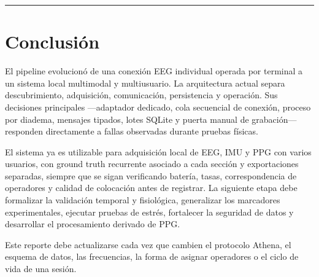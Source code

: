 \documentclass[11pt,a4paper]{article}
\begin{document}
\medskip\hrule\medskip

\section{Conclusión}

El pipeline evolucionó de una conexión EEG individual operada por terminal a un sistema local multimodal y multiusuario. La arquitectura actual separa descubrimiento, adquisición, comunicación, persistencia y operación. Sus decisiones principales —adaptador dedicado, cola secuencial de conexión, proceso por diadema, mensajes tipados, lotes SQLite y puerta manual de grabación— responden directamente a fallas observadas durante pruebas físicas.

El sistema ya es utilizable para adquisición local de EEG, IMU y PPG con varios usuarios,
con ground truth recurrente asociado a cada sección y exportaciones separadas, siempre que se sigan verificando
batería, tasas, correspondencia de operadores y calidad de colocación antes de registrar.
La siguiente etapa debe formalizar la validación temporal y fisiológica, generalizar los
marcadores experimentales, ejecutar pruebas de estrés, fortalecer la seguridad de datos y
desarrollar el procesamiento derivado de PPG.

Este reporte debe actualizarse cada vez que cambien el protocolo Athena, el esquema de datos, las frecuencias, la forma de asignar operadores o el ciclo de vida de una sesión.
\end{document}

